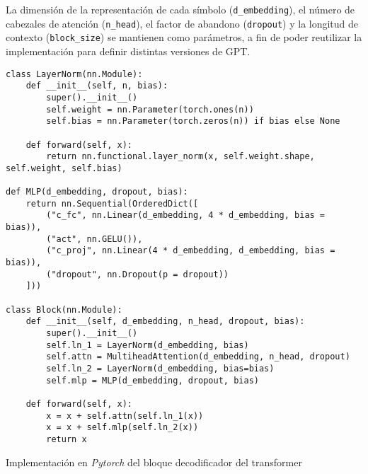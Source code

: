 La dimensión de la representación de cada símbolo (\texttt{d\_embedding}), el número de cabezales de atención (\texttt{n\_head}), el factor de abandono (\texttt{dropout}) y la longitud de contexto (\texttt{block\_size}) se mantienen como parámetros, a fin de poder reutilizar la implementación para definir distintas versiones de GPT. 

\begin{code}
\begin{verbatim}
class LayerNorm(nn.Module):
    def __init__(self, n, bias):
        super().__init__()
        self.weight = nn.Parameter(torch.ones(n))
        self.bias = nn.Parameter(torch.zeros(n)) if bias else None

    def forward(self, x):
        return nn.functional.layer_norm(x, self.weight.shape, self.weight, self.bias)

def MLP(d_embedding, dropout, bias):
    return nn.Sequential(OrderedDict([
        ("c_fc", nn.Linear(d_embedding, 4 * d_embedding, bias = bias)),
        ("act", nn.GELU()),
        ("c_proj", nn.Linear(4 * d_embedding, d_embedding, bias = bias)),
        ("dropout", nn.Dropout(p = dropout))
    ]))

class Block(nn.Module):
    def __init__(self, d_embedding, n_head, dropout, bias):
        super().__init__()
        self.ln_1 = LayerNorm(d_embedding, bias)
        self.attn = MultiheadAttention(d_embedding, n_head, dropout)
        self.ln_2 = LayerNorm(d_embedding, bias=bias)
        self.mlp = MLP(d_embedding, dropout, bias)

    def forward(self, x):
        x = x + self.attn(self.ln_1(x))
        x = x + self.mlp(self.ln_2(x))
        return x
\end{verbatim}
\caption{Implementación en \textit{Pytorch} del bloque decodificador del transformer}
\label{code:decoder}
\end{code}

